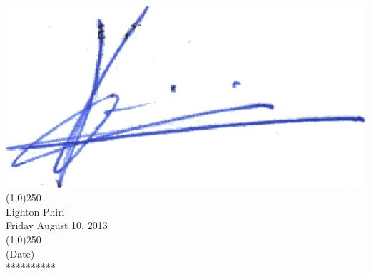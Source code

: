 \begin{center}
 \includegraphics[scale=0.50]{figures/phiri_digital_signature.eps}\\
 \line(1,0){250}\\
 {Lighton Phiri}\\
 \vspace{.8in}
 Friday August 10, 2013\\
 \line(1,0){250}\\
 {(Date)}\\
 \vspace{.6in}
 {**********}\\
\end{center}